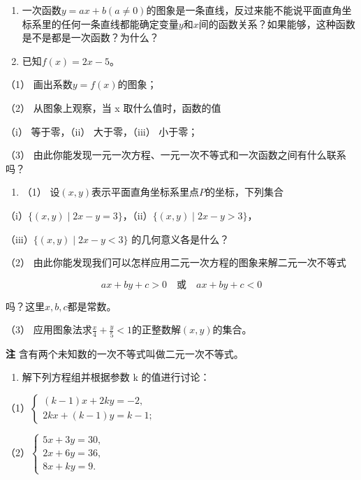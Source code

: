 \begin{enumerate}
\item
  一次函数\(y = ax + b (a \neq 0)\)的图象是一条直线，反过来能不能说平面直角坐标系里的任何一条直线都能确定变量\(y\)和\(x\)间的函数关系？如果能够，这种函数是不是都是一次函数？为什么？
\item
  已知\(f(x) = 2x - 5\)。
\end{enumerate}

（1） 画出系数\(y = f(x)\)的图象；

（2） 从图象上观察，当 x 取什么值时，函数的值

（i） 等于零，（ii） 大于零，（iii） 小于零；

（3）
由此你能发现一元一次方程、一元一次不等式和一次函数之间有什么联系吗？

\begin{enumerate}[start=3]
\item
  （1） 设\((x, y)\)表示平面直角坐标系里点\(P\)的坐标，下列集合
\end{enumerate}

（i）\(\{(x,y)\mid2x-y=3\}\)，（ii）\(\{(x,y)\mid2x-y>3\}\)，

（iii）\(\{(x,y)\mid2x-y<3\}\) 的几何意义各是什么？

（2） 由此你能发现我们可以怎样应用二元一次方程的图象来解二元一次不等式

\[
a x + b y + c > 0 \quad \text{或} \quad a x + b y + c < 0
\]

吗？这里\(x, b, c\)都是常数。

（3）
应用图象法求\(\frac{x}{4} + \frac{y}{5} < 1\)的正整数解\((x, y)\)的集合。

\textbf{注} 含有两个未知数的一次不等式叫做二元一次不等式。

\begin{enumerate}[start=4]
\item
  解下列方程组并根据参数 k 的值进行讨论：
\end{enumerate}

（1）\(\left\{ \begin{array}{l} (k - 1)x + 2ky = -2, \\ 2kx + (k - 1)y = k - 1; \end{array} \right.\)

（2）\(\left\{ \begin{array}{l} 5x + 3y = 30, \\ 2x + 6y = 36, \\ 8x + ky = 9. \end{array} \right.\)

